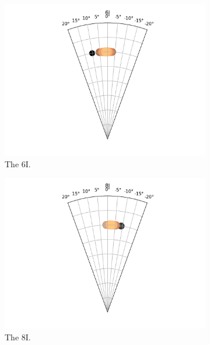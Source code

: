 \documentclass{kththesis}
\begin{document}
\begin{figure}
    \centering
    \begin{subfigure}{0.4\textwidth}
    \centering
    \includegraphics[width=\textwidth]{AgentDirectionChoices/MPDQN_Pebble_Direction_Choices_6I.png} 
    \caption{The 6I.}
    \label{fig:6I_pebble_deviation}
    \end{subfigure}
    \begin{subfigure}{0.4\textwidth}
    \centering
    \includegraphics[width=\textwidth]{AgentDirectionChoices/MPDQN_Pebble_Direction_Choices_8I.png} 
    \caption{The 8I.}
    \label{fig:8I_pebble_deviation}
    \end{subfigure}
    \begin{subfigure}{0.4\textwidth}

\end{subfigure}
\end{figure}
\end{document}
